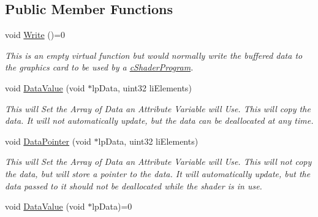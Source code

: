 \subsection*{Public Member Functions}
\begin{DoxyCompactItemize}
\item 
\hypertarget{classc_uniform_store_a411655ecc2215907e4d8d0a89698fb63}{
void \hyperlink{classc_uniform_store_a411655ecc2215907e4d8d0a89698fb63}{Write} ()=0}
\label{classc_uniform_store_a411655ecc2215907e4d8d0a89698fb63}

\begin{DoxyCompactList}\small\item\em This is an empty virtual function but would normally write the buffered data to the graphics card to be used by a \hyperlink{classc_shader_program}{cShaderProgram}. \end{DoxyCompactList}\item 
\hypertarget{classc_uniform_store_a38387f1488bdae7ccc74196659cb3ede}{
void \hyperlink{classc_uniform_store_a38387f1488bdae7ccc74196659cb3ede}{DataValue} (void $\ast$lpData, uint32 liElements)}
\label{classc_uniform_store_a38387f1488bdae7ccc74196659cb3ede}

\begin{DoxyCompactList}\small\item\em This will Set the Array of Data an Attribute Variable will Use. This will copy the data. It will not automatically update, but the data can be deallocated at any time. \end{DoxyCompactList}\item 
\hypertarget{classc_uniform_store_a08f744432a74e4765d42df24d00c4135}{
void \hyperlink{classc_uniform_store_a08f744432a74e4765d42df24d00c4135}{DataPointer} (void $\ast$lpData, uint32 liElements)}
\label{classc_uniform_store_a08f744432a74e4765d42df24d00c4135}

\begin{DoxyCompactList}\small\item\em This will Set the Array of Data an Attribute Variable will Use. This will not copy the data, but will store a pointer to the data. It will automatically update, but the data passed to it should not be deallocated while the shader is in use. \end{DoxyCompactList}\item 
\hypertarget{classc_uniform_store_ad2332410c6b979b8a950c49a8400f789}{
void \hyperlink{classc_uniform_store_ad2332410c6b979b8a950c49a8400f789}{DataValue} (void $\ast$lpData)=0}
\label{classc_uniform_store_ad2332410c6b979b8a950c49a8400f789}


\end{DoxyCompactItemize}
